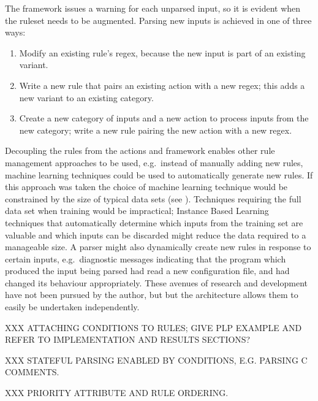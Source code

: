 The framework issues a warning for each unparsed input, so it is evident
when the ruleset needs to be augmented.  Parsing new inputs is achieved in
one of three ways:

\begin{enumerate}

    \item Modify an existing rule's regex, because the new input is part of
        an existing variant.

    \item Write a new rule that pairs an existing action with a new regex;
        this adds a new variant to an existing category.

    \item Create a new category of inputs and a new action to process
        inputs from the new category; write a new rule pairing the new
        action with a new regex.

\end{enumerate}

Decoupling the rules from the actions and framework enables other rule
management approaches to be used, e.g.\ instead of manually adding new
rules, machine learning techniques could be used to automatically generate
new rules.  If this approach was taken the choice of machine learning
technique would be constrained by the size of typical data sets (see
).  Techniques requiring the full data set
when training would be impractical; Instance Based
Learning~\cite{instance-based-learning} techniques that automatically
determine which inputs from the training set are valuable and which inputs
can be discarded might reduce the data required to a manageable size.  A
parser might also dynamically create new rules in response to certain
inputs, e.g.\ diagnostic messages indicating that the program which
produced the input being parsed had read a new configuration file, and had
changed its behaviour appropriately.  These avenues of research and
development have not been pursued by the author, but but the architecture
allows them to easily be undertaken independently.

XXX ATTACHING CONDITIONS TO RULES\@; GIVE PLP EXAMPLE AND REFER TO
IMPLEMENTATION AND RESULTS SECTIONS\@?

XXX STATEFUL PARSING ENABLED BY CONDITIONS, E.G\@.  PARSING C COMMENTS\@.

XXX PRIORITY ATTRIBUTE AND RULE ORDERING\@.

